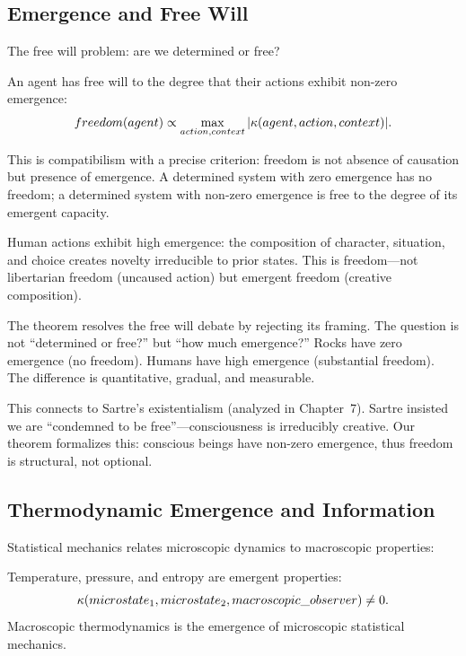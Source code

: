 \subsection{Emergence and Free Will}

The free will problem: are we determined or free?

\begin{theorem}
\label{thm:free-will}
An agent has free will to the degree that their actions exhibit non-zero emergence:
\[
  freedom(agent) \propto \max_{action, context} |\kappa(agent, action, context)|.
\]
\end{theorem}

\begin{interpretation}
This is compatibilism with a precise criterion: freedom is not absence of causation
but presence of emergence. A determined system with zero emergence has no freedom;
a determined system with non-zero emergence is free to the degree of its emergent
capacity.

Human actions exhibit high emergence: the composition of character, situation,
and choice creates novelty irreducible to prior states. This is freedom---not
libertarian freedom (uncaused action) but emergent freedom (creative composition).

The theorem resolves the free will debate by rejecting its framing. The question
is not ``determined or free?'' but ``how much emergence?'' Rocks have zero
emergence (no freedom). Humans have high emergence (substantial freedom). The
difference is quantitative, gradual, and measurable.

This connects to Sartre's existentialism (analyzed in Chapter~7). Sartre insisted
we are ``condemned to be free''---consciousness is irreducibly creative. Our
theorem formalizes this: conscious beings have non-zero emergence, thus freedom
is structural, not optional.
\end{interpretation}

\subsection{Thermodynamic Emergence and Information}

Statistical mechanics relates microscopic dynamics to macroscopic properties:

\begin{theorem}
\label{thm:thermodynamic-emergence}
Temperature, pressure, and entropy are emergent properties:
\[
  \kappa(microstate_1, microstate_2, macroscopic\_observer) \neq 0.
\]
Macroscopic thermodynamics is the emergence of microscopic statistical mechanics.
\end{theorem}

